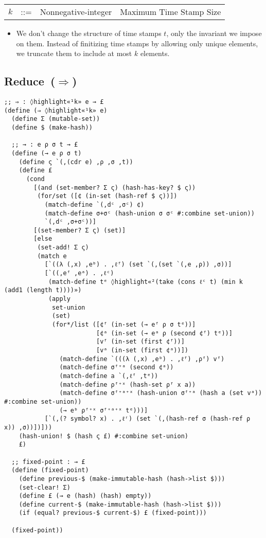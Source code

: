 \documentclass[12pt, oneside]{book}
\begin{document}
\begin{tabular}{rcll}
  \(k\) & ::= & Nonnegative-integer & Maximum Time Stamp Size \\
\end{tabular}

\begin{itemize}
  \item We don’t change the structure of time stamps \(t\), only the invariant we impose on them. Instead of finitizing time stamps by allowing only unique elements, we truncate them to include at most \(k\) elements.
\end{itemize}

\subsection{Reduce~(\(⇒\))}

\begin{Verbatim}
;; ⇒ : ◊highlight«¹k» e → £
(define (⇒ ◊highlight«¹k» e)
  (define Σ (mutable-set))
  (define $ (make-hash))

  ;; → : e ρ σ t → £
  (define (→ e ρ σ t)
    (define ς `(,(cdr e) ,ρ ,σ ,t))
    (define £
      (cond
        [(and (set-member? Σ ς) (hash-has-key? $ ς))
         (for/set ([¢ (in-set (hash-ref $ ς))])
           (match-define `(,dᶜ ,σᶜ) ¢)
           (match-define σ+σᶜ (hash-union σ σᶜ #:combine set-union))
           `(,dᶜ ,σ+σᶜ))]
        [(set-member? Σ ς) (set)]
        [else
         (set-add! Σ ς)
         (match e
           [`((λ (,x) ,eᵇ) . ,ℓᶠ) (set `(,(set `(,e ,ρ)) ,σ))]
           [`((,eᶠ ,eᵃ) . ,ℓᶜ)
            (match-define tᵉ ◊highlight«²(take (cons ℓᶜ t) (min k (add1 (length t))))»)
            (apply
             set-union
             (set)
             (for*/list ([¢ᶠ (in-set (→ eᶠ ρ σ tᵉ))]
                         [¢ᵃ (in-set (→ eᵃ ρ (second ¢ᶠ) tᵉ))]
                         [vᶠ (in-set (first ¢ᶠ))]
                         [vᵃ (in-set (first ¢ᵃ))])
               (match-define `(((λ (,x) ,eᵇ) . ,ℓᶠ) ,ρᶠ) vᶠ)
               (match-define σᶠ⁺ᵃ (second ¢ᵃ))
               (match-define a `(,ℓᶠ ,tᵉ))
               (match-define ρᶠ⁺ˣ (hash-set ρᶠ x a))
               (match-define σᶠ⁺ᵃ⁺ˣ (hash-union σᶠ⁺ᵃ (hash a (set vᵃ)) #:combine set-union))
               (→ eᵇ ρᶠ⁺ˣ σᶠ⁺ᵃ⁺ˣ tᵉ)))]
           [`(,(? symbol? x) . ,ℓʳ) (set `(,(hash-ref σ (hash-ref ρ x)) ,σ))])]))
    (hash-union! $ (hash ς £) #:combine set-union)
    £)

  ;; fixed-point : → £
  (define (fixed-point)
    (define previous-$ (make-immutable-hash (hash->list $)))
    (set-clear! Σ)
    (define £ (→ e (hash) (hash) empty))
    (define current-$ (make-immutable-hash (hash->list $)))
    (if (equal? previous-$ current-$) £ (fixed-point)))

  (fixed-point))
\end{Verbatim}
\end{document}
